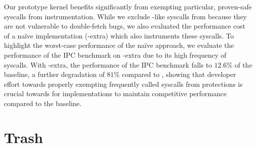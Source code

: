 \documentclass[letterpaper,twocolumn,10pt, anonymous]{article}
\begin{document}
Our prototype \tiktok kernel benefits significantly from 
exempting particular, proven-safe syscalls from instrumentation.
While we exclude -like syscalls from \tiktok because they 
are not vulnerable to double-fetch bugs, we also evaluated the
performance cost of a na\"ive implementation (\tiktok-extra)
which also instruments these syscalls.
To highlight the worst-case performance of the na\"ive approach, we 
evaluate the performance of the IPC benchmark on \tiktok-extra due 
to its high frequency of  syscalls.
With \tiktok-extra, the performance of the IPC benchmark falls to 
$12.6\%$ of the baseline, a further degradation of $81\%$ compared 
to \tiktok, showing that developer effort towards properly exempting 
frequently called syscalls from \tiktok protections is crucial
towards for implementations to maintain competitive performance
compared to the baseline.

\section{Trash}






\end{document}
